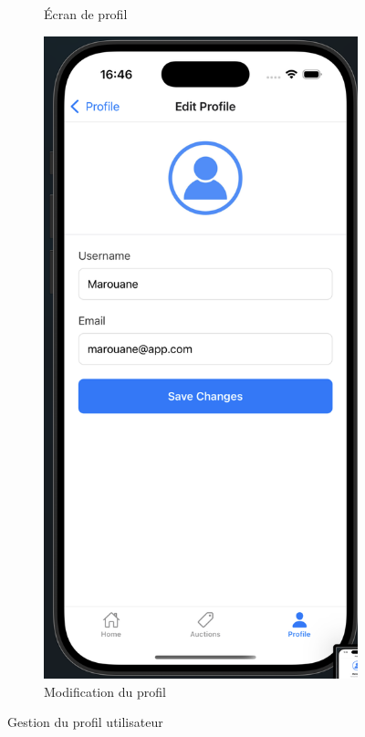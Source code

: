 \begin{figure}[H]
\begin{subfigure}[b]{0.48\textwidth}
        \caption{Écran de profil}
        \label{fig:profile}
    \end{subfigure}
    \hfill
    \begin{subfigure}[b]{0.48\textwidth}
        \includegraphics[width=\textwidth]{images/profile edit .png}
        \caption{Modification du profil}
        \label{fig:profile-edit}
    \end{subfigure}
    \caption{Gestion du profil utilisateur}
    \label{fig:profile-management}
\end{figure}

